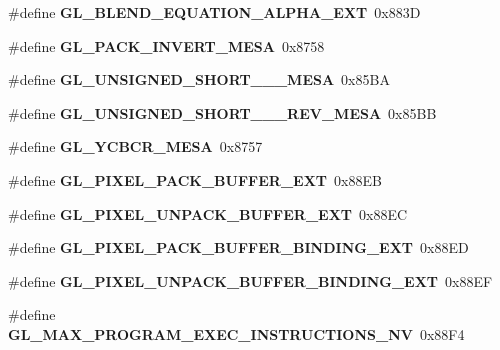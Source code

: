 \begin{DoxyCompactItemize}
\item 
\#define {\bfseries G\+L\+\_\+\+B\+L\+E\+N\+D\+\_\+\+E\+Q\+U\+A\+T\+I\+O\+N\+\_\+\+A\+L\+P\+H\+A\+\_\+\+E\+X\+T}~0x883\+D\label{_s_d_l__opengl_8h_a56c6273823f93796b3a7b7433cd81b68}

\item 
\#define {\bfseries G\+L\+\_\+\+P\+A\+C\+K\+\_\+\+I\+N\+V\+E\+R\+T\+\_\+\+M\+E\+S\+A}~0x8758\label{_s_d_l__opengl_8h_a99111e12773c8d5f673ffc827d1e968c}

\item 
\#define {\bfseries G\+L\+\_\+\+U\+N\+S\+I\+G\+N\+E\+D\+\_\+\+S\+H\+O\+R\+T\+\_\+\_\+\_\+\+M\+E\+S\+A}~0x85\+B\+A\label{_s_d_l__opengl_8h_a3030194a9fc8601b83c5c2354df6be7f}

\item 
\#define {\bfseries G\+L\+\_\+\+U\+N\+S\+I\+G\+N\+E\+D\+\_\+\+S\+H\+O\+R\+T\+\_\+\_\+\_\+\+R\+E\+V\+\_\+\+M\+E\+S\+A}~0x85\+B\+B\label{_s_d_l__opengl_8h_a4d805e3a058338cabacccebba2fe7748}

\item 
\#define {\bfseries G\+L\+\_\+\+Y\+C\+B\+C\+R\+\_\+\+M\+E\+S\+A}~0x8757\label{_s_d_l__opengl_8h_a518da63c200e221aae1b742510770eb6}

\item 
\#define {\bfseries G\+L\+\_\+\+P\+I\+X\+E\+L\+\_\+\+P\+A\+C\+K\+\_\+\+B\+U\+F\+F\+E\+R\+\_\+\+E\+X\+T}~0x88\+E\+B\label{_s_d_l__opengl_8h_aed9e58bc0e24f27a9d9771337444e766}

\item 
\#define {\bfseries G\+L\+\_\+\+P\+I\+X\+E\+L\+\_\+\+U\+N\+P\+A\+C\+K\+\_\+\+B\+U\+F\+F\+E\+R\+\_\+\+E\+X\+T}~0x88\+E\+C\label{_s_d_l__opengl_8h_a4638afec0f4636f396796aeff7884310}

\item 
\#define {\bfseries G\+L\+\_\+\+P\+I\+X\+E\+L\+\_\+\+P\+A\+C\+K\+\_\+\+B\+U\+F\+F\+E\+R\+\_\+\+B\+I\+N\+D\+I\+N\+G\+\_\+\+E\+X\+T}~0x88\+E\+D\label{_s_d_l__opengl_8h_ab2cb03cc173fa663bec83111251f6d94}

\item 
\#define {\bfseries G\+L\+\_\+\+P\+I\+X\+E\+L\+\_\+\+U\+N\+P\+A\+C\+K\+\_\+\+B\+U\+F\+F\+E\+R\+\_\+\+B\+I\+N\+D\+I\+N\+G\+\_\+\+E\+X\+T}~0x88\+E\+F\label{_s_d_l__opengl_8h_afca1b2c3a11b046b45e36fc15b4c47a2}

\item 
\#define {\bfseries G\+L\+\_\+\+M\+A\+X\+\_\+\+P\+R\+O\+G\+R\+A\+M\+\_\+\+E\+X\+E\+C\+\_\+\+I\+N\+S\+T\+R\+U\+C\+T\+I\+O\+N\+S\+\_\+\+N\+V}~0x88\+F4\label{_s_d_l__opengl_8h_a9a07e39a9f85010d2d84b7000722f338}


\end{DoxyCompactItemize}
